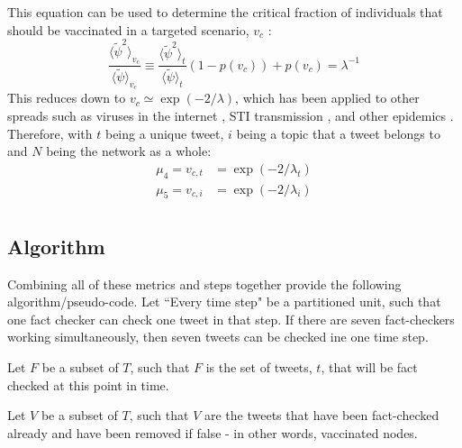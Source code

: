 \documentclass[preprint,12pt]{elsarticle}
\begin{document}
This equation can be used to determine the critical fraction of individuals that should be vaccinated in a targeted scenario, $v_c$ \cite{pastor2002immunization,cohen2001breakdown}:  \begin{equation}
 \frac{\langle \tilde{\psi}^2 \rangle_{v_c}}{\langle \tilde{\psi} \rangle_{v_c}} \equiv \frac{\langle \tilde{\psi}^2 \rangle_{t}}{\langle \tilde{\psi} \rangle_{t}}(1-p(v_c))+p(v_c)=\lambda^{-1}
\end{equation}
This reduces down to $v_c \simeq \exp{(-2/\lambda)}$, which has been applied to other spreads such as viruses in the internet \citep{kephart1993computers}, STI transmission \citep{anderson1992infectious,lloyd2001viruses}, and other epidemics \citep{diekmann2000mathematical}. 
Therefore, with $t$ being a unique tweet, $i$ being a topic that a tweet belongs to and $N$ being the network as a whole:
\begin{equation}
\label{mu_4 and mu_5}
\begin{split}
    \mu_4 = v_{c,t} & = \exp(-2/\lambda_{t}) \\
    \mu_5 = v_{c,i} & = \exp(-2/\lambda_{i}) \\
\end{split}
\end{equation}

\subsection{Algorithm}
Combining all of these metrics and steps together provide the following algorithm/pseudo-code. Let ``Every time step" be a partitioned unit, such that one fact checker can check one tweet in that step. If there are seven fact-checkers working simultaneously, then seven tweets can be checked ine one time step.

Let $F$ be a subset of $T$, such that $F$ is the set of tweets, $t$, that will be fact checked at this point in time.

Let $V$ be a subset of $T$, such that $V$ are the tweets that have been fact-checked already and have been removed if false - in other words, vaccinated nodes.
\end{document}
